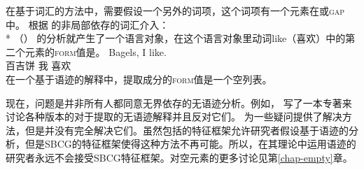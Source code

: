 在基于词汇的方法中，需要假设一个另外的词项，这个词项有一个元素在\slaschc 或\textsc{gap}中。
\ea
根据 \citet[]{Sag2012a}的非局部依存的词汇介入：\\*
\z
（） 的分析就产生了一个语言对象，在这个语言对象里动词like（喜欢）\argstlc 中的第二个元素的\textsc{form}值是。
\ea
\gll Bagels, I like.\\
百吉饼 我 喜欢 \\
\z
在一个基于语迹的解释中，提取成分的\textsc{form}值是一个空列表。

现在，问题是并非所有人都同意无界依存的无语迹分析。例如， \citet{LH2006a}写了一本专著来讨论各种版本的对于提取的无语迹解释并且反对它们。 \citet{Chaves2009a}为一些疑问提供了解决方法，但是并没有完全解决它们。虽然包括\localfc 的特征框架允许研究者假设基于语迹的分析，但是SBCG的特征框架使得这种方法不再可能。所以，在其理论中运用语迹的研究者永远不会接受SBCG特征框架。对空元素的更多讨论见第\ref{chap-empty}章。

